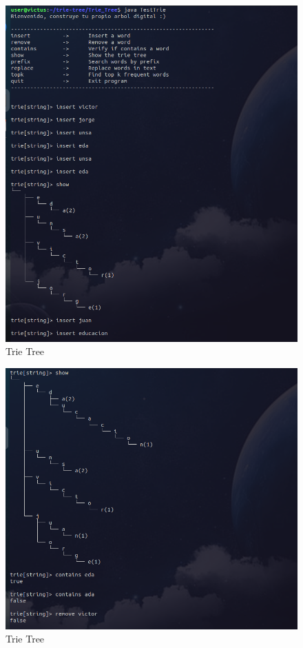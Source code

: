 \documentclass[11pt, a4paper]{article}
\begin{document}
\begin{figure}[H]
  \centering
  \includegraphics[width=1.0\textwidth]{img/E1.png}
  \caption{Trie Tree}
\end{figure}

\begin{figure}[H]
  \centering
  \includegraphics[width=1.0\textwidth]{img/E2.png}
  \caption{Trie Tree}
\end{figure}
\end{document}
